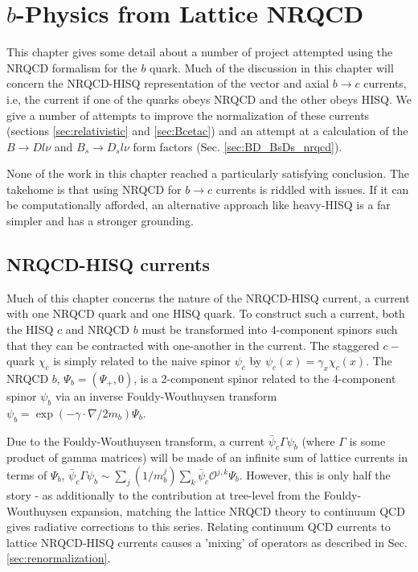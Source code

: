 \chapter{$b$-Physics from Lattice NRQCD}

This chapter gives some detail about a number of project attempted using the NRQCD formalism for the $b$ quark. Much of the discussion in this chapter will concern the NRQCD-HISQ representation of the vector and axial $b\to c$ currents, i.e, the current if one of the quarks obeys NRQCD and the other obeys HISQ. We give a number of attempts to improve the normalization of these currents (sections \ref{sec:relativistic} and \ref{sec:Bcetac}) and an attempt at a calculation of the $B\to Dl\nu$ and $B_s\to D_s l\nu$ form factors (Sec. \ref{sec:BD_BsDs_nrqcd}).

None of the work in this chapter reached a particularly satisfying conclusion. The takehome is that using NRQCD for $b \to c$ currents is riddled with issues. If it can be computationally afforded, an alternative approach like heavy-HISQ is a far simpler and has a stronger grounding.

\section{NRQCD-HISQ currents}

Much of this chapter concerns the nature of the NRQCD-HISQ current, a current with one NRQCD quark and one HISQ quark. To construct such a current, both the HISQ $c$ and NRQCD $b$ must be transformed into 4-component spinors such that they can be contracted with one-another in the current. The staggered $c-$quark $\chi_c$ is simply related to the naive spinor $\psi_c$ by $\psi_c(x)=\gamma_x \chi_c(x)$. The NRQCD $b$, $\Psi_{b} = ( \Psi_+, 0 )$, is a 2-component spinor related to the 4-component spinor $\psi_b$ via an inverse Fouldy-Wouthuysen transform $\psi_b = \exp( - \gamma\cdot \nabla / 2m_b )\Psi_b$.

Due to the Fouldy-Wouthuysen transform, a current $\bar{\psi}_c \Gamma \psi_b$ (where $\Gamma$ is some product of gamma matrices) will be made of an infinite sum of lattice currents in terms of $\Psi_b$, $\bar{\psi}_c \Gamma \psi_b \sim \sum_j (1/m_b^j) \sum_k \bar{\psi}_c \mathcal{O}^{j,k} \Psi_b$. However, this is only half the story - as additionally to the contribution at tree-level from the Fouldy-Wouthuysen expansion, matching the lattice NRQCD theory to continuum QCD gives radiative corrections to this series. Relating continuum QCD currents to lattice NRQCD-HISQ currents causes a 'mixing' of operators as described in Sec. \ref{sec:renormalization}.

